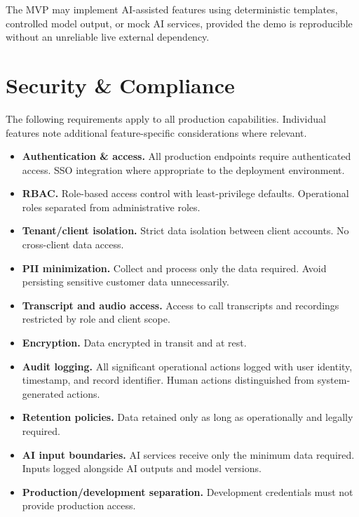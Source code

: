 \documentclass[11pt,a4paper]{article}
\begin{document}
The MVP may implement AI-assisted features using deterministic templates, controlled model output, or mock AI services, provided the demo is reproducible without an unreliable live external dependency.

\section{Security \& Compliance}

The following requirements apply to all production capabilities. Individual features note additional feature-specific considerations where relevant.

\begin{itemize}
  \item \textbf{Authentication \& access.} All production endpoints require authenticated access. SSO integration where appropriate to the deployment environment.
  \item \textbf{RBAC.} Role-based access control with least-privilege defaults. Operational roles separated from administrative roles.
  \item \textbf{Tenant/client isolation.} Strict data isolation between client accounts. No cross-client data access.
  \item \textbf{PII minimization.} Collect and process only the data required. Avoid persisting sensitive customer data unnecessarily.
  \item \textbf{Transcript and audio access.} Access to call transcripts and recordings restricted by role and client scope.
  \item \textbf{Encryption.} Data encrypted in transit and at rest.
  \item \textbf{Audit logging.} All significant operational actions logged with user identity, timestamp, and record identifier. Human actions distinguished from system-generated actions.
  \item \textbf{Retention policies.} Data retained only as long as operationally and legally required.
  \item \textbf{AI input boundaries.} AI services receive only the minimum data required. Inputs logged alongside AI outputs and model versions.
  \item \textbf{Production/development separation.} Development credentials must not provide production access.
\end{itemize}
\end{document}
